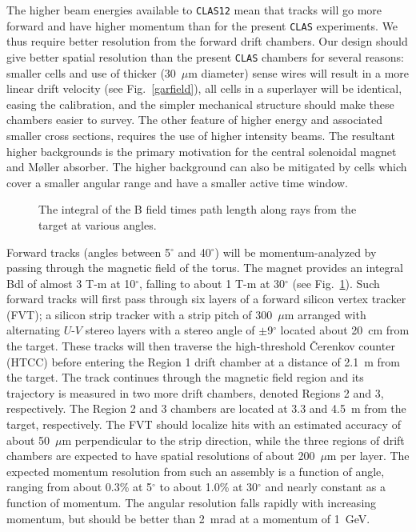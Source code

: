 The higher beam energies available to {\tt CLAS12} mean that tracks will 
go more forward and have higher momentum than for the present {\tt CLAS} 
experiments.  We thus require better resolution from the forward drift 
chambers.  Our design should give better spatial resolution than the
present {\tt CLAS} chambers for several reasons: smaller cells and use of 
thicker (30~$\mu$m diameter) sense wires will result in a more linear drift
velocity (see Fig.~\ref{garfield}), all cells in a superlayer will be 
identical, easing the calibration, and the simpler mechanical structure 
should make these chambers easier to survey.  The other feature of higher 
energy and associated smaller cross sections, requires the use of higher 
intensity beams.  The resultant higher backgrounds is the primary motivation 
for the central solenoidal magnet and M{\o}ller absorber.  The higher 
background can also be mitigated by cells which cover a smaller angular 
range and have a smaller active time window.  

\begin{figure}[htbp]
\vspace{7.2cm}
\caption{\small{The integral of the B field times path length along
rays from the target at various angles.}}
\label{bdl}
\end{figure}

Forward tracks (angles between 5$^{\circ}$ and 40$^{\circ}$) will be 
momentum-analyzed by passing through the magnetic field of the torus.
The magnet provides an integral Bdl of almost 3 T-m at 10$^{\circ}$, 
falling to about 1 T-m at 30$^{\circ}$ (see Fig.~\ref{bdl}).  Such forward 
tracks will first pass through six layers of a forward silicon vertex tracker 
(FVT); a silicon strip tracker with a strip pitch of 300~$\mu$m arranged with 
alternating $U$-$V$ stereo layers with a stereo angle of $\pm$9$^{\circ}$ 
located about 20~cm from the target.  These tracks will then traverse the 
high-threshold {\v C}erenkov counter (HTCC) before entering the Region 1 
drift chamber at a distance of 2.1~m from the target.  The track continues 
through the magnetic field region and its trajectory is measured in two 
more drift chambers, denoted Regions 2 and 3, respectively.  The Region 2 
and 3 chambers are located at 3.3 and 4.5~m from the target, respectively.  
The FVT should localize hits with an estimated accuracy of about 50~$\mu$m 
perpendicular to the strip direction, while the three regions of drift 
chambers are expected to have spatial resolutions of about 200~$\mu$m per 
layer.  The expected momentum resolution from such an assembly is a function 
of angle, ranging from about 0.3\% at 5$^{\circ}$ to about 1.0\% at 
30$^{\circ}$ and nearly constant as a function of momentum.  The angular 
resolution falls rapidly with increasing momentum, but should be better than 
2~mrad at a momentum of 1~GeV.

